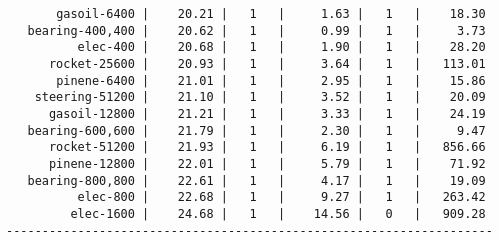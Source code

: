 \begin{verbatim}
       gasoil-6400 |    20.21 |   1   |     1.63 |   1   |    18.30
   bearing-400,400 |    20.62 |   1   |     0.99 |   1   |     3.73
          elec-400 |    20.68 |   1   |     1.90 |   1   |    28.20
      rocket-25600 |    20.93 |   1   |     3.64 |   1   |   113.01
       pinene-6400 |    21.01 |   1   |     2.95 |   1   |    15.86
    steering-51200 |    21.10 |   1   |     3.52 |   1   |    20.09
      gasoil-12800 |    21.21 |   1   |     3.33 |   1   |    24.19
   bearing-600,600 |    21.79 |   1   |     2.30 |   1   |     9.47
      rocket-51200 |    21.93 |   1   |     6.19 |   1   |   856.66
      pinene-12800 |    22.01 |   1   |     5.79 |   1   |    71.92
   bearing-800,800 |    22.61 |   1   |     4.17 |   1   |    19.09
          elec-800 |    22.68 |   1   |     9.27 |   1   |   263.42
         elec-1600 |    24.68 |   1   |    14.56 |   0   |   909.28
--------------------------------------------------------------------
\end{verbatim}
    

